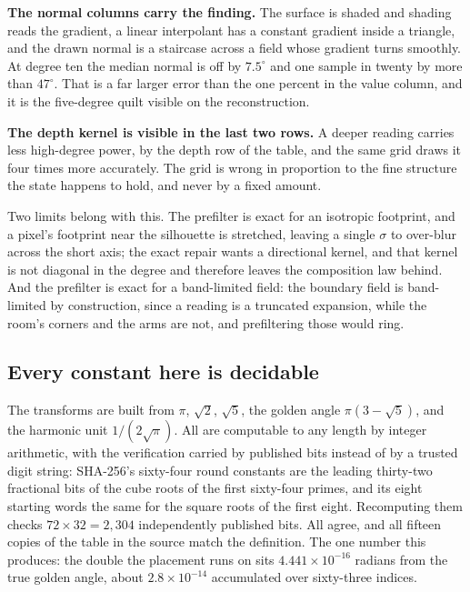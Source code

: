 \textbf{The normal columns carry the finding.} The surface is shaded and shading reads the gradient, a linear interpolant has a constant gradient inside a triangle, and the drawn normal is a staircase across a field whose gradient turns smoothly. At degree ten the median normal is off by \(7.5^\circ\) and one sample in twenty by more than \(47^\circ\). That is a far larger error than the one percent in the value column, and it is the five-degree quilt visible on the reconstruction.

\textbf{The depth kernel is visible in the last two rows.} A deeper reading carries less high-degree power, by the depth row of the table, and the same grid draws it four times more accurately. The grid is wrong in proportion to the fine structure the state happens to hold, and never by a fixed amount.

Two limits belong with this. The prefilter is exact for an isotropic footprint, and a pixel's footprint near the silhouette is stretched, leaving a single \(\sigma\) to over-blur across the short axis; the exact repair wants a directional kernel, and that kernel is not diagonal in the degree and therefore leaves the composition law behind. And the prefilter is exact for a band-limited field: the boundary field is band-limited by construction, since a reading is a truncated expansion, while the room's corners and the arms are not, and prefiltering those would ring.

\subsection{Every constant here is decidable}

The transforms are built from \(\pi\), \(\sqrt2\), \(\sqrt5\), the golden angle \(\pi(3-\sqrt5)\), and the harmonic unit \(1/(2\sqrt\pi)\). All are computable to any length by integer arithmetic, with the verification carried by published bits instead of by a trusted digit string: SHA-256's sixty-four round constants are the leading thirty-two fractional bits of the cube roots of the first sixty-four primes, and its eight starting words the same for the square roots of the first eight. Recomputing them checks \(72 \times 32 = 2{,}304\) independently published bits. All agree, and all fifteen copies of the table in the source match the definition. The one number this produces: the double the placement runs on sits \(4.441 \times 10^{-16}\) radians from the true golden angle, about \(2.8 \times 10^{-14}\) accumulated over sixty-three indices.

